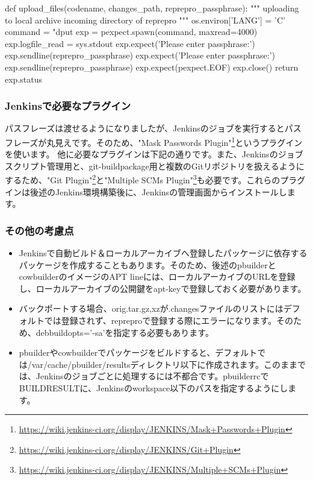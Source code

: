 \documentclass[mingoth,a4paper]{jsarticle}
\begin{document}
\begin{commandline}
def upload_files(codename, changes_path, reprepro_passphrase):
    """ uploading to local archive incoming directory of reprepro """
    os.environ['LANG'] = 'C'
    command = "dput %
    exp = pexpect.spawn(command, maxread=4000)
    exp.logfile_read = sys.stdout
    exp.expect('Please enter passphrase:')
    exp.sendline(reprepro_passphrase)
    exp.expect('Please enter passphrase:')
    exp.sendline(reprepro_passphrase)
    exp.expect(pexpect.EOF)
    exp.close()
    return exp.status
\end{commandline}

\subsubsection{Jenkinsで必要なプラグイン}

パスフレーズは渡せるようになりましたが、Jenkinsのジョブを実行するとパスフレーズが丸見えです。そのため、"Mask Passwords Plugin"\footnote{\url{https://wiki.jenkins-ci.org/display/JENKINS/Mask+Passwords+Plugin}}というプラグインを使います。
他に必要なプラグインは下記の通りです。また、Jenkinsのジョブスクリプト管理用と、git-buildpackage用と複数のGitリポジトリを扱えるようにするため、"Git Plugin"\footnote{\url{https://wiki.jenkins-ci.org/display/JENKINS/Git+Plugin}}と"Multiple SCMs Plugin"\footnote{\url{https://wiki.jenkins-ci.org/display/JENKINS/Multiple+SCMs+Plugin}}も必要です。これらのプラグインは後述のJenkins環境構築後に、Jenkinsの管理画面からインストールします。

\subsubsection{その他の考慮点}
\begin{itemize}
\item Jenkinsで自動ビルド＆ローカルアーカイブへ登録したパッケージに依存するパッケージを作成することもあります。そのため、後述のpbuilderとcowbuilderのイメージのAPT lineには、ローカルアーカイブのURLを登録し、ローカルアーカイブの公開鍵をapt-keyで登録しておく必要があります。
\item バックポートする場合、orig.tar.{gz,xz}が.changesファイルのリストにはデフォルトでは登録されず、repreproで登録する際にエラーになります。そのため、debbuildopts='-sa'を指定する必要もあります。
\item pbuilderやcowbuilderでパッケージをビルドすると、デフォルトでは/var/cache/pbuilder/resultsディレクトリ以下に作成されます。このままでは、Jenkinsのジョブごとに処理するには不都合です。pbuilderrcでBUILDRESULTに、Jenkinsのworkspace以下のパスを指定するようにします。
\end{itemize}
\end{document}
